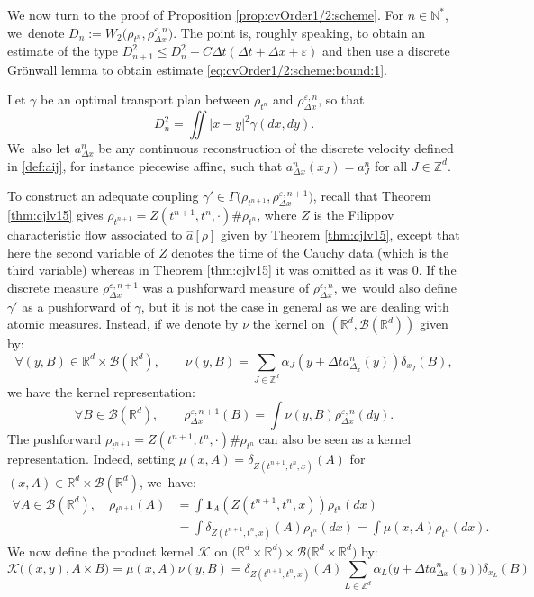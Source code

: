 \documentclass[JEP,XML,SOM,Unicode, NoFloatCountersInSection,published]{cedram}
\def\NN{\mathbb{N}}
\def\RR{\mathbb{R}}
\def\ZZ{\mathbb{Z}}
\def\eps{\varepsilon}
\def\dt{\Delta t}
\def\dx{\Delta x}
\def\calB{{\mathcal B}}
\def\achapo{\widehat{a}}
\theoremstyle{plain}
\theoremstyle{definition}
\begin{document}
We now turn to the proof of Proposition \ref{prop:cvOrder1/2:scheme}.
For $n \in \NN^*$, we~denote $D_n:= W_2 \bigl(\rho_{t^n},\rho_{\dx}^{\eps,n} \bigr)$. The point is, roughly speaking, to obtain an estimate of the type $D_{n+1}^2 \leq D_n^2 + C\dt(\dt + \dx + \eps)$ and then use a discrete Grönwall lemma to obtain estimate \eqref{eq:cvOrder1/2:scheme:bound:1}.

Let $\gamma$ be an optimal transport plan between $\rho_{t^n}$ and $\rho_{\dx}^{\eps,n}$, so that
\[
D_n^2 =\iint |x-y|^2 \gamma(dx,dy).
\]
We~also let $a^n_{\dx}$ be any continuous reconstruction of the discrete velocity defined in \eqref{def:aij}, for instance piecewise affine, such that $a_{\dx}^n(x_J) = a_J^n$ for all $J \in \ZZ^d$.

To construct an adequate coupling $\gamma' \in \Gamma\big(\rho_{t^{n+1}}, \rho_{\dx}^{\eps,n+1}\big)$, recall that Theorem \ref{thm:cjlv15} gives $\rho_{t^{n+1}} = Z(t^{n+1}, t^n, \cdot) \# \rho_{t^n}$, where $Z$ is the Filippov characteristic flow associated to $\achapo[\rho]$ given by Theorem \ref{thm:cjlv15}, except that here the second variable of $Z$ denotes the time of the Cauchy data (which is the third variable) whereas in Theorem \ref{thm:cjlv15} it was omitted as it was $0$. If the discrete measure $\rho_{\dx}^{\eps,n+1}$ was a pushforward measure of $\rho_{\dx}^{\eps,n}$, we~would also define $\gamma'$ as a pushforward of $\gamma$, but it is not the case in general as we are dealing with atomic measures. Instead, if we denote by $\nu$ the kernel on $(\RR^d, \calB(\RR^d))$ given by:
\[
\forall (y, B) \in \RR^d \times \calB(\RR^d), \qquad \nu(y, B) = \sum_{J \in \ZZ^d} \alpha_J(y + \dt a^n_{\Delta_x}(y)) \delta_{x_J}(B),
\]
we have the kernel representation:
\[
\forall B \in \calB(\RR^d), \qquad \rho_{\dx}^{\eps,n+1}(B) = \int \nu(y, B) \rho_{\dx}^{\eps,n}(dy).
\]
The pushforward $\rho_{t^{n+1}} = Z(t^{n+1}, t^n, \cdot) \# \rho_{t^n}$ can also be seen as a kernel representation. Indeed, setting $\mu(x, A) = \delta_{Z(t^{n+1}, t^n, x)}(A)$ for $(x,A) \in \RR^d \times \calB(\RR^d)$, we~have:
\begin{align*}
\forall A \in \calB(\RR^d), \quad \rho_{t^{n+1}}(A) &= \int {\mathbf 1}_{A}(Z(t^{n+1}, t^n, x)) \rho_{t^n} (dx) \\
&= \int \delta_{Z(t^{n+1}, t^n, x)}(A) \rho_{t^n} (dx) = \int \mu(x, A) \rho_{t^n} (dx).
\end{align*}
We now define the product kernel ${\mathcal K}$ on $\big(\RR^d \times \RR^d \big) \times \calB\big(\RR^d \times \RR^d \big)$ by:
\[
{\mathcal K} \bigl( (x,y), A \times B \bigr) = \mu(x,A) \nu(y,B) = \delta_{Z(t^{n+1}, t^n, x)}(A)
\sum_{L \in {\ZZ}^d} \alpha_{L}\bigl(y+\dt a^n_{\dx}(y) \bigr)
\delta_{x_L}(B)
\]
\end{document}
